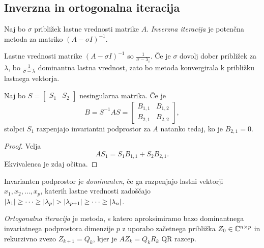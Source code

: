 \newpage

\subsection{Inverzna in ortogonalna iteracija}

\begin{definicija}
Naj bo $\sigma$ približek lastne vrednosti matrike $A$.
\emph{Inverzna iteracija}
je potenčna metoda za matriko $(A - \sigma I)^{-1}$.
\end{definicija}

\begin{opomba}
Lastne vrednosti matrike $(A - \sigma I)^{-1}$ so
$\frac{1}{\sigma - \lambda_i}$. Če je $\sigma$ dovolj dober
približek za $\lambda$, bo $\frac{1}{\sigma - \lambda}$ dominantna
lastna vrednost, zato bo metoda konvergirala k približku lastnega
vektorja.
\end{opomba}

\begin{lema}
Naj bo $S =
\begin{bmatrix}
S_1 & S_2
\end{bmatrix}$ nesingularna matrika. Če je
\[
B = S^{-1} A S =
\begin{bmatrix}
B_{1,1} & B_{1,2} \\
B_{2,1} & B_{2,2}
\end{bmatrix},
\]
stolpci $S_1$ razpenjajo invariantni podprostor za $A$ natanko
tedaj, ko je $B_{2,1} = 0$.
\end{lema}

\begin{proof}
Velja
\[
AS_1 = S_1 B_{1,1} + S_2 B_{2,1}.
\]
Ekvivalenca je zdaj očitna.
\end{proof}

\begin{definicija}
Invarianten podprostor je \emph{dominanten}, če ga razpenjajo
lastni vektorji $x_1, x_2, \dots, x_p$, katerih lastne vrednosti
zadoščajo
$\left\lvert \lambda_1\right\rvert \geq \dots \geq \left\lvert \lambda_p\right\rvert >
\left\lvert \lambda_{p+1}\right\rvert \geq \dots \geq \left\lvert \lambda_n\right\rvert$.
\end{definicija}

\begin{definicija}
\emph{Ortogonalna iteracija}
je metoda, s katero aproksimiramo bazo dominantnega invariatnega
podprostora dimenzije $p$ z uporabo začetnega približka
$Z_0 \in \mathbb{C}^{n \times p}$ in rekurzivno zvezo
$Z_{k+1} = Q_k$, kjer je $A Z_k = Q_k R_k$ QR razcep.
\end{definicija}

